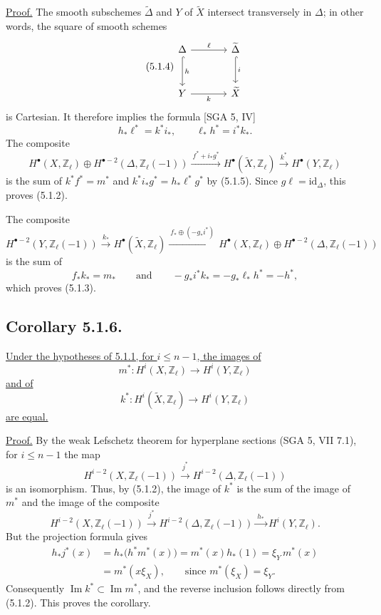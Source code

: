 \underline{Proof.}
The smooth subschemes $\widetilde\Delta$ and $Y$ of $\widetilde X$
intersect transversely in $\Delta$; in other words, the square of smooth
schemes
\begin{equation}\tag{5.1.4}
\begin{tikzcd}[column sep=large,row sep=large]
\Delta\arrow[r,"\ell"]\arrow[d,hook,"h"]
  &\widetilde\Delta\arrow[d,hook,"i"]\\
Y\arrow[r,"k"']&\widetilde X
\end{tikzcd}
\end{equation}
is Cartesian.  It therefore implies the formula [SGA 5, IV]
\begin{equation}\tag{5.1.5}
h_*\ell^*=k^*i_* ,\qquad \ell_*h^*=i^*k_*.
\end{equation}
The composite
\[
H^\bullet(X,\mathbb Z_\ell)\oplus
H^{\bullet-2}(\Delta,\mathbb Z_\ell(-1))
\xrightarrow{\ f^*+i_*g^*\ }
H^\bullet(\widetilde X,\mathbb Z_\ell)
\xrightarrow{\ k^*\ }
H^\bullet(Y,\mathbb Z_\ell)
\]
is the sum of
$k^*f^*=m^*$ and
$k^*i_*g^*=h_*\ell^*g^*$ by (5.1.5).  Since
$g\ell=\mathrm{id}_\Delta$, this proves (5.1.2).

The composite
\[
H^{\bullet-2}(Y,\mathbb Z_\ell(-1))
\xrightarrow{\ k_*\ }
H^\bullet(\widetilde X,\mathbb Z_\ell)
\xrightarrow{\ f_*\oplus(-g_*i^*)\ }
H^\bullet(X,\mathbb Z_\ell)\oplus
H^{\bullet-2}(\Delta,\mathbb Z_\ell(-1))
\]
is the sum of
\[
f_*k_*=m_*
\qquad\text{and}\qquad
-g_*i^*k_*=-g_*\ell_*h^*=-h^*,
\]
which proves (5.1.3).

\subsection*{Corollary 5.1.6.}
\underline{Under the hypotheses of 5.1.1, for $i\leq n-1$, the images
of}
\[
m^*:H^i(X,\mathbb Z_\ell)\longrightarrow H^i(Y,\mathbb Z_\ell)
\]
\underline{and of}
\[
k^*:H^i(\widetilde X,\mathbb Z_\ell)
   \longrightarrow H^i(Y,\mathbb Z_\ell)
\]
\underline{are equal.}

\underline{Proof.}
By the weak Lefschetz theorem for hyperplane sections (SGA 5, VII 7.1),
for $i\leq n-1$ the map
\begin{equation}\tag{5.1.7}
H^{i-2}(X,\mathbb Z_\ell(-1))
\xrightarrow{\ j^*\ }
H^{i-2}(\Delta,\mathbb Z_\ell(-1))
\end{equation}
is an isomorphism.  Thus, by (5.1.2), the image of $k^*$ is the sum of
the image of $m^*$ and the image of the composite
\[
H^{i-2}(X,\mathbb Z_\ell(-1))
\xrightarrow{\ j^*\ }
H^{i-2}(\Delta,\mathbb Z_\ell(-1))
\xrightarrow{\ h_*\ }
H^i(Y,\mathbb Z_\ell).
\]
But the projection formula gives
\[
\begin{aligned}
h_*j^*(x)
 &=h_*\bigl(h^*m^*(x)\bigr)
  =m^*(x)h_*(1)
  =\xi_Y\,m^*(x)\\
 &=m^*(x\xi_X),
 \qquad\text{since }m^*(\xi_X)=\xi_Y.
\end{aligned}
\]
Consequently $\operatorname{Im}k^*\subset\operatorname{Im}m^*$, and
the reverse inclusion follows directly from (5.1.2).  This proves the
corollary.
